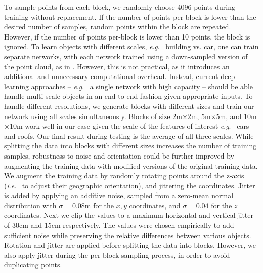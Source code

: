 \documentclass[final,3p,times,twocolumn,authoryear]{elsarticle}
\newcommand{\mxy}[1]{ \color{red}{#1}}
\newcommand{\ie}{\textit{i}.\textit{e}.}
\newcommand{\eg}{\textit{e}.\textit{g}.}
\begin{document}
To sample points from each block, we randomly choose 4096 points during training without replacement.
If the number of points per-block is lower than the desired number of samples, random points within the block are repeated. 
However, if the number of points per-block is lower than 10 points, the block is ignored. 
To learn objects with different scales, \eg~ building vs. car, one can train separate networks, with each network trained using a down-sampled version of the point cloud, as in \citet{maturana2015voxnet}. 
However, this is not practical, as it introduces an additional and unnecessary computational overhead. 
Instead, current deep learning approaches -- \eg~ a single network with high capacity -- should be able handle multi-scale objects in an end-to-end fashion given appropriate inputs. 
To handle different resolutions, we generate blocks with different sizes and train our network using all scales simultaneously. %
Blocks of size 2m$\times$2m, 5m$\times$5m, and 10m$\times$10m work well in our case given the scale of the features of interest \eg~ cars and roofs. 
Our final result during testing is the average of all three scales.
While splitting the data into blocks with different sizes increases the number of training samples, robustness to noise and orientation could be further improved by augmenting the training data with modified versions of the original training data. 
We augment the training data by randomly rotating points around the z-axis (\ie~ to adjust their geographic orientation), and jittering the coordinates.  
Jitter is added by applying an additive noise, sampled from a zero-mean normal distribution with $\sigma=0.08$m for the $x,y$ coordinates, and $\sigma=0.04$ for the $z$ coordinates. 
Next we clip the values to a maximum horizontal and vertical jitter of 30cm and 15cm respectively. 
The values were chosen empirically to add sufficient noise while preserving the relative differences between various objects.
Rotation and jitter are applied before splitting the data into blocks. However, we also apply jitter during the per-block sampling process, in order to avoid duplicating points. %
\end{document}
